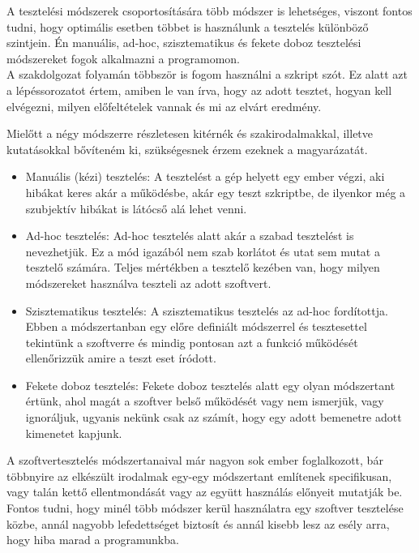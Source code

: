 
A tesztelési módszerek csoportosítására több módszer is lehetséges, viszont fontos tudni, hogy optimális esetben többet is használunk a tesztelés különböző szintjein. Én manuális, ad-hoc, szisztematikus és fekete doboz tesztelési módszereket fogok alkalmazni a programomon.\\
A szakdolgozat folyamán többször is fogom használni a szkript szót. Ez alatt azt a lépéssorozatot értem, amiben le van írva, hogy az adott tesztet, hogyan kell elvégezni, milyen előfeltételek vannak és mi az elvárt eredmény.


Mielőtt a négy módszerre részletesen kitérnék és szakirodalmakkal, illetve kutatásokkal bővíteném ki, szükségesnek érzem ezeknek a magyarázatát.
\begin{itemize}

\item Manuális (kézi) tesztelés: A tesztelést a gép helyett egy ember végzi, aki  hibákat keres akár a működésbe, akár egy teszt szkriptbe, de ilyenkor még a szubjektív hibákat is látócső alá lehet venni.

\item Ad-hoc tesztelés: Ad-hoc tesztelés alatt akár a szabad tesztelést is nevezhetjük. Ez a mód igazából nem szab korlátot és utat sem mutat a tesztelő számára. Teljes mértékben a tesztelő kezében van, hogy milyen módszereket használva teszteli az adott szoftvert.

\item Szisztematikus tesztelés: A szisztematikus tesztelés az ad-hoc fordítottja. Ebben a módszertanban egy előre definiált módszerrel és tesztesettel tekintünk a szoftverre és mindig pontosan azt a funkció működését ellenőrizzük amire a teszt eset íródott.

\item Fekete doboz tesztelés: Fekete doboz tesztelés alatt egy olyan módszertant értünk, ahol magát a szoftver belső működését vagy nem ismerjük, vagy ignoráljuk, ugyanis nekünk csak az számít, hogy egy adott bemenetre adott kimenetet kapjunk.
\end{itemize}

A szoftvertesztelés módszertanaival már nagyon sok ember foglalkozott, bár többnyire az elkészült irodalmak egy-egy módszertant említenek specifikusan, vagy talán kettő ellentmondását vagy az együtt használás előnyeit mutatják be. Fontos tudni, hogy minél több módszer kerül használatra egy szoftver tesztelése közbe, annál nagyobb lefedettséget biztosít és annál kisebb lesz az esély arra, hogy hiba marad a programunkba.

